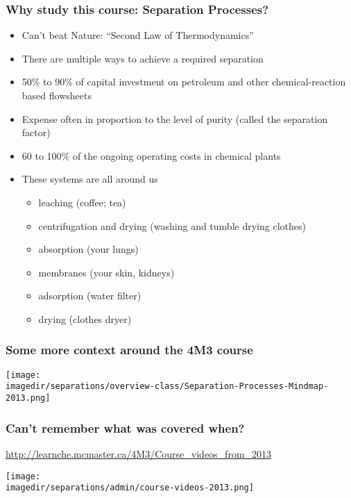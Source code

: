 \begin{frame}\frametitle{Why study this course: Separation Processes?}
	\begin{itemize}
		\item	Can't beat Nature: ``Second Law of Thermodynamics''
		\item	There are multiple ways to achieve a required separation
		\item	50\% to 90\% of capital investment on petroleum and other chemical-reaction based flowsheets 
		\item	Expense often in proportion to the level of purity (called the separation factor) %
		\item	60 to 100\% of the ongoing operating costs in chemical plants  %
		\item	These systems are all around us
		\begin{itemize}
			\item	leaching (coffee; tea)
			\item	centrifugation and drying (washing and tumble drying clothes)
			\item	absorption (your lungs)
			\item	membranes (your skin, kidneys)
			\item	adsorption (water filter)
			\item	drying (clothes dryer)
		\end{itemize}
	\end{itemize}
\end{frame}

\begin{frame}\frametitle{Some more context around the 4M3 course}
	\begin{center}
		\texttt{[image: \\imagedir/separations/overview-class/Separation-Processes-Mindmap-2013.png]}
	\end{center}
\end{frame}

\begin{frame}\frametitle{Can't remember what was covered when?}
	\begin{exampleblock}{}
		\href{http://learnche.mcmaster.ca/4M3/Course\_videos\_from\_2013}{http://learnche.mcmaster.ca/4M3/Course\_videos\_from\_2013}
	\end{exampleblock}
	\begin{center}
		\texttt{[image: \\imagedir/separations/admin/course-videos-2013.png]}
	\end{center}
\end{frame}

